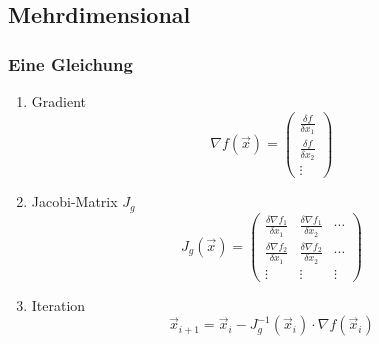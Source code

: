 \subsection{Mehrdimensional}
\subsubsection*{Eine Gleichung}
\begin{enumerate}

	\item Gradient
	\begin{displaymath}
		\nabla f(\vec{x}) =
		\begin{pmatrix}
			\frac{\delta f}{\delta x_1} \\
			\frac{\delta f}{\delta x_2} \\
			\vdots
		\end{pmatrix}
	\end{displaymath}
	
	\item Jacobi-Matrix $J_g$
	\begin{displaymath}
		J_g(\vec{x}) =
		\begin{pmatrix}
			\frac{\delta \nabla f_1}{\delta x_1}  & \frac{\delta \nabla f_1}{\delta x_2} & \cdots \\[5pt]
			\frac{\delta \nabla f_2}{\delta x_1}  & \frac{\delta \nabla f_2}{\delta x_2} & \cdots \\
			\vdots & \vdots & \vdots
		\end{pmatrix}
	\end{displaymath}
	
	\item Iteration
	\begin{displaymath}
		\vec{x}_{i+1} = \vec{x}_i - J_g^{-1}(\vec{x}_i) \cdot \nabla f(\vec{x}_i)
	\end{displaymath}

\end{enumerate}

